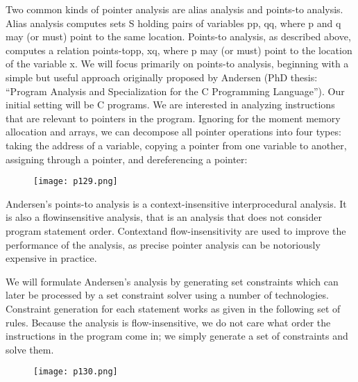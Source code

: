 \cite{notes07p17:online}Two common kinds of pointer analysis are alias analysis and points-to analysis. Alias analysis
computes sets S holding pairs of variables pp, qq, where p and q may (or must) point to the same
location. Points-to analysis, as described above, computes a relation points-topp, xq, where p may
(or must) point to the location of the variable x. We will focus primarily on points-to analysis,
beginning with a simple but useful approach originally proposed by Andersen (PhD thesis:
“Program Analysis and Specialization for the C Programming Language”).
Our initial setting will be C programs. We are interested in analyzing instructions that are
relevant to pointers in the program. Ignoring for the moment memory allocation and arrays, we
can decompose all pointer operations into four types: taking the address of a variable, copying a
pointer from one variable to another, assigning through a pointer, and dereferencing a pointer:


\begin{figure}[H]
	\centering
	\texttt{[image: p129.png]}
	\label{fig:p129}
\end{figure}


Andersen’s points-to analysis is a context-insensitive interprocedural analysis. It is also a flowinsensitive analysis, that is an analysis that does not consider program statement order. Contextand flow-insensitivity are used to improve the performance of the analysis, as precise pointer
analysis can be notoriously expensive in practice.

We will formulate Andersen’s analysis by generating set constraints which can later be processed by a set constraint solver using a number of technologies. Constraint generation for each
statement works as given in the following set of rules. Because the analysis is flow-insensitive,
we do not care what order the instructions in the program come in; we simply generate a set of
constraints and solve them.


\begin{figure}[H]
	\centering
	\texttt{[image: p130.png]}
	\label{fig:p130}
\end{figure}

